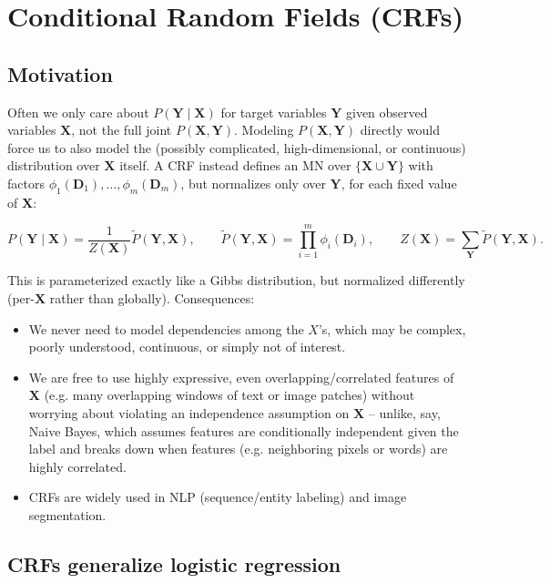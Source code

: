 \documentclass[11pt]{article}
\begin{document}
\section{Conditional Random Fields (CRFs)}

\subsection{Motivation}

Often we only care about $P(\mathbf{Y}\mid\mathbf{X})$ for target variables
$\mathbf{Y}$ given observed variables $\mathbf{X}$, not the full joint
$P(\mathbf{X},\mathbf{Y})$. Modeling $P(\mathbf{X},\mathbf{Y})$ directly
would force us to also model the (possibly complicated, high-dimensional,
or continuous) distribution over $\mathbf{X}$ itself. A CRF instead defines
an MN over $\{\mathbf{X}\cup\mathbf{Y}\}$ with factors
$\phi_1(\mathbf{D}_1),\dots,\phi_m(\mathbf{D}_m)$, but normalizes only over
$\mathbf{Y}$, for each fixed value of $\mathbf{X}$:

\[
P(\mathbf{Y}\mid\mathbf{X}) = \frac{1}{Z(\mathbf{X})}\tilde P(\mathbf{Y},\mathbf{X}),
\qquad
\tilde P(\mathbf{Y},\mathbf{X}) = \prod_{i=1}^m \phi_i(\mathbf{D}_i),
\qquad
Z(\mathbf{X}) = \sum_{\mathbf{Y}} \tilde P(\mathbf{Y},\mathbf{X}).
\]

This is parameterized exactly like a Gibbs distribution, but normalized
differently (per-$\mathbf{X}$ rather than globally). Consequences:
\begin{itemize}
  \item We never need to model dependencies among the $X$'s, which may be
    complex, poorly understood, continuous, or simply not of interest.
  \item We are free to use highly expressive, even overlapping/correlated
    features of $\mathbf{X}$ (e.g. many overlapping windows of text or
    image patches) without worrying about violating an independence
    assumption on $\mathbf{X}$ -- unlike, say, Naive Bayes, which assumes
    features are conditionally independent given the label and breaks down
    when features (e.g. neighboring pixels or words) are highly
    correlated.
  \item CRFs are widely used in NLP (sequence/entity labeling) and image
    segmentation.
\end{itemize}

\subsection{CRFs generalize logistic regression}
\end{document}
